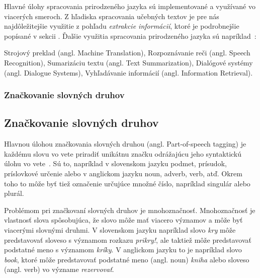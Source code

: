 Hlavné úlohy spracovania prirodzeného jazyka sú implementované a využívané vo viacerých smeroch. Z hľadiska spracovania učebných textov je pre nás najdôležitejšie využitie z pohľadu \textit{extrakcie informácií}, ktoré je podrobnejšie popísané v sekcii . Ďalšie využitia spracovania prirodzeného jazyka sú napríklad~\cite{Preeti}:
\begin{my_itemize}
	\myitem Strojový preklad (angl. Machine Translation),
	\myitem Rozpoznávanie reči (angl. Speech Recognition),
	\myitem Sumarizáciu textu (angl. Text Summarization),
	\myitem Dialógové systémy (angl. Dialogue Systems),
	\myitem Vyhľadávanie informácií (angl. Information Retrieval).
\end{my_itemize}

%
%
{
	\subsubsection{Značkovanie slovných druhov}
}
{
	\subsection{Značkovanie slovných druhov}
}
\label{subsubsec:postagging}
Hlavnou úlohou značkovania slovných druhou (angl. Part-of-speech tagging) je každému slovu vo vete priradiť unikátnu značku odrážajúcu jeho syntaktickú úlohu vo vete~\cite{collobert2011}. Sú to, napríklad v slovenskom jazyku podmet, prísudok, príslovkové určenie alebo v anglickom jazyku noun, adverb, verb, atď. Okrem toho to môže byť tiež označenie určujúce množné číslo, napríklad singulár alebo plurál.

Problémom pri značkovaní slovných druhov je mnohoznačnosť. Mnohoznačnosť je vlastnosť slova spôsobujúca, že slovo môže mať viacero významov a môže byť viacerými slovnými druhmi. V slovenskom jazyku napríklad slovo \textit{kry} môže predstavovať sloveso s významom rozkazu \textit{prikry!}, ale taktiež môže predstavovať podstatné meno s významom \textit{kríky}. V anglickom jazyku to je napríklad slovo \textit{book}, ktoré môže predstavovať podstatné meno (angl. noun) \textit{kniha} alebo sloveso (angl. verb) vo význame \textit{rezervovať}.

